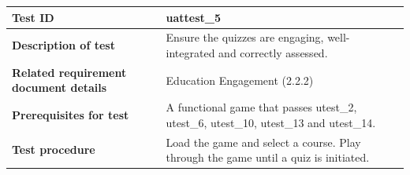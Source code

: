 \documentclass[11pt, a4paper]{article}
\begin{document}
\begin{center}
\begin{tabularx}{\linewidth}{|>{\raggedright\arraybackslash}m{4cm}|X|}
    \hline
    \textbf{Test ID} & uattest\_5 \\
    \hline
    \textbf{Description of test} & Ensure the quizzes are engaging, well-integrated and correctly assessed. \\
    \hline
    \textbf{Related requirement document details} & Education Engagement (2.2.2) \\
    \hline
    \textbf{Prerequisites for test} & A functional game that passes utest\_2, utest\_6, utest\_10, utest\_13 and utest\_14. \\
    \hline
    \textbf{Test procedure} & Load the game and select a course. Play through the game until a quiz is initiated.


\end{tabularx}
\end{center}
\end{document}
